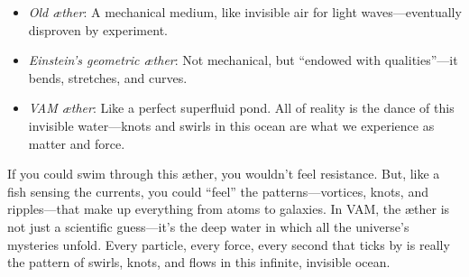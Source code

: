 \begin{itemize}

\item
\textit{Old æther}: A mechanical medium, like invisible air for light waves—eventually disproven by experiment.




\item
\textit{Einstein’s geometric æther}: Not mechanical, but “endowed with qualities”—it bends, stretches, and curves.




\item
\textit{VAM æther}: Like a perfect superfluid pond. All of reality is the dance of this invisible water—knots and swirls in this ocean are what we experience as matter and force.




\end{itemize}

If you could swim through this æther, you wouldn’t feel resistance. But, like a fish sensing the currents, you could “feel” the patterns—vortices, knots, and ripples—that make up everything from atoms to galaxies. In VAM, the æther is not just a scientific guess—it’s the deep water in which all the universe’s mysteries unfold. Every particle, every force, every second that ticks by is really the pattern of swirls, knots, and flows in this infinite, invisible ocean.
